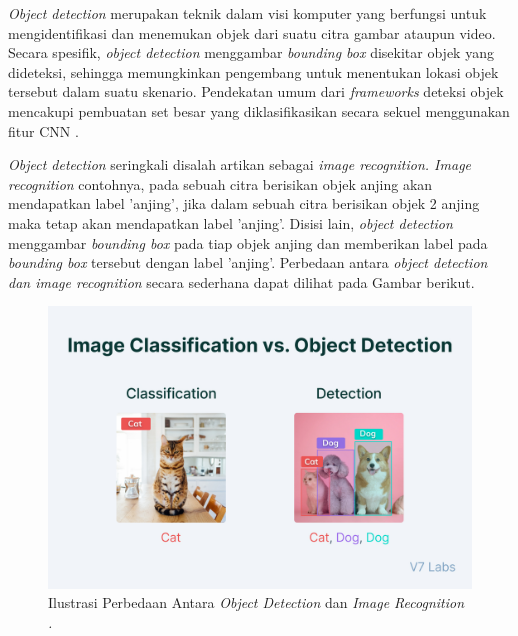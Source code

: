 \textit{Object detection} merupakan teknik dalam visi komputer yang berfungsi untuk mengidentifikasi dan menemukan objek dari suatu citra gambar ataupun video. Secara spesifik, \textit{object detection} menggambar \textit{bounding box} disekitar objek yang dideteksi, sehingga memungkinkan pengembang untuk menentukan lokasi objek tersebut dalam suatu skenario. Pendekatan umum dari  \textit{frameworks} deteksi objek mencakupi pembuatan set besar yang diklasifikasikan secara sekuel menggunakan fitur CNN \citep*{voulodimos2018deep}. \par

\textit{Object detection} seringkali disalah artikan sebagai \textit{image recognition. Image recognition} contohnya, pada sebuah citra berisikan objek anjing akan mendapatkan label 'anjing', jika dalam sebuah citra berisikan objek 2 anjing maka tetap akan mendapatkan label 'anjing'. Disisi lain, \textit{object detection} menggambar \textit{bounding box} pada tiap objek anjing dan memberikan label pada \textit{bounding box} tersebut dengan label 'anjing'. Perbedaan antara \textit{object detection \textnormal{dan} image recognition} secara sederhana dapat dilihat pada Gambar berikut. 
\par

\begin{figure}[H]
    \centering
    \includegraphics[scale=0.5]{gambar/object_detection_vs_image_recognition.jpg}
    \caption{Ilustrasi Perbedaan Antara \textit{Object Detection} dan \textit{Image Recognition \citep*{rizzoli_2022}.}}
    \label{fig:objectdetcompare}
\end{figure}

